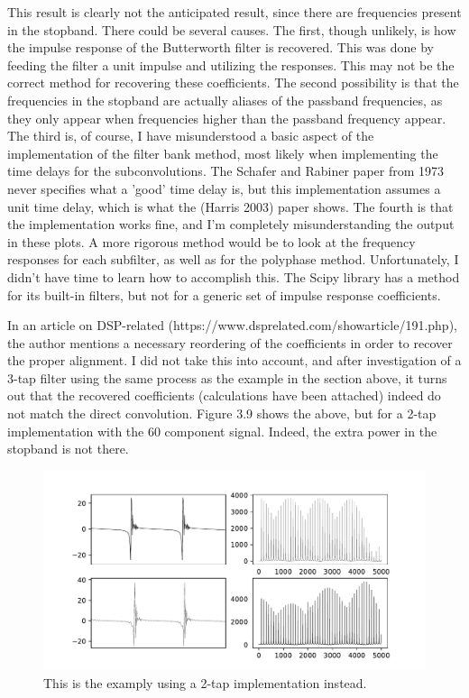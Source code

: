 \documentclass{report}
\begin{document}
This result is clearly not the anticipated result, since there are frequencies present in the stopband.  There could be several causes.  The first, though unlikely, is how the impulse response of the Butterworth filter is recovered.  This was done by feeding the filter a unit impulse and utilizing the responses.  This may not be the correct method for recovering these coefficients.  The second possibility is that the frequencies in the stopband are actually aliases of the passband frequencies, as they only appear when frequencies higher than the passband frequency appear.  The third is, of course, I have misunderstood a basic aspect of the implementation of the filter bank method, most likely when implementing the time delays for the subconvolutions.  The Schafer and Rabiner paper from 1973 never specifies what a 'good' time delay is, but this implementation assumes a unit time delay, which is what the (Harris 2003) paper shows.  The fourth is that the implementation works fine, and I'm completely misunderstanding the output in these plots.  A more rigorous method would be to look at the frequency responses for each subfilter, as well as for the polyphase method.  Unfortunately, I didn't have time to learn how to accomplish this.  The Scipy library has a method for its built-in filters, but not for a generic set of impulse response coefficients.

In an article on DSP-related (https://www.dsprelated.com/showarticle/191.php), the author mentions a necessary reordering of the coefficients in order to recover the proper alignment.  I did not take this into account, and after investigation of a 3-tap filter using the same process as the example in the section above, it turns out that the recovered coefficients (calculations have been attached) indeed do not match the direct convolution.  Figure 3.9 shows the above, but for a 2-tap implementation with the 60 component signal.  Indeed, the extra power in the stopband is not there. 

\begin{figure}[ht]
\includegraphics[scale=.55]{Figure_9.pdf}
\caption{This is the examply using a 2-tap implementation instead.}
\end{figure} 
\end{document}
